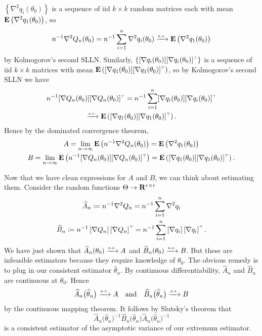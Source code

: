 \documentclass[11pt,letterpaper,reqno,oneside]{article}
\begin{document}
$\left\{ \nabla^2 q_i(\theta_0) \right\}$ is a sequence of iid $k \times k$ random matrices each with mean $\mathbf{E}\left( \nabla^2 q_1(\theta_0) \right)$, so
%
\begin{equation*}
	n^{-1} \nabla^2 Q_n(\theta_0)
	= n^{-1} \sum_{i=1}^n \nabla^2 q_i(\theta_0)
	\xrightarrow{{\scriptscriptstyle \mathrm{a.s.}}} \mathbf{E}\left( \nabla^2 q_1(\theta_0) \right)
\end{equation*}
%
by Kolmogorov's second SLLN. Similarly, $\left\{ [ \nabla q_i(\theta_0) ] [ \nabla q_i(\theta_0) ]^{\scriptscriptstyle \top} \right\}$ is a sequence of iid $k \times k$ matrices with mean $\mathbf{E}\left( [ \nabla q_1(\theta_0) ] [ \nabla q_1(\theta_0) ]^{\scriptscriptstyle \top} \right)$, so by Kolmogorov's second SLLN we have
%
\begin{multline*}
	n^{-1} [ \nabla Q_n(\theta_0) ] [ \nabla Q_n(\theta_0) ]^{\scriptscriptstyle \top}
	= n^{-1} \sum_{i=1}^n [ \nabla q_i(\theta_0) ] 
	[ \nabla q_i(\theta_0) ]^{\scriptscriptstyle \top}
	\\
	\xrightarrow{{\scriptscriptstyle \mathrm{a.s.}}} \mathbf{E}\left( [ \nabla q_1(\theta_0) ] 
	[ \nabla q_1(\theta_0) ]^{\scriptscriptstyle \top} \right) .
\end{multline*}
%
Hence by the dominated convergence theorem, 
%
\begin{gather*}
	A = \lim_{n\to\infty} 
	\mathbf{E}\left( n^{-1} \nabla^2 Q_n(\theta_0) \right)
	= \mathbf{E}\left( \nabla^2 q_1(\theta_0) \right)
	\\
	B = \lim_{n\to\infty} 
	\mathbf{E}\left( n^{-1} [ \nabla Q_n(\theta_0) ] 
	[ \nabla Q_n(\theta_0) ]^{\scriptscriptstyle \top} \right)
	= \mathbf{E}\left( [ \nabla q_1(\theta_0) ] 
	[ \nabla q_1(\theta_0) ]^{\scriptscriptstyle \top} \right) .
\end{gather*}


Now that we have clean expressions for $A$ and $B$, we can think about estimating them. Consider the random functions $\Theta \to \mathbf{R}^{r \times r}$
%
\begin{gather*}
	\widehat{A}_n
	\coloneqq n^{-1} \nabla^2 Q_n
	= n^{-1} \sum_{i=1}^n \nabla^2 q_i 
	\\
	\widehat{B}_n
	\coloneqq n^{-1} \left[ \nabla Q_n \right] 
	\left[ \nabla Q_n \right]^{\scriptscriptstyle \top}
	= n^{-1} \sum_{i=1}^n \left[ \nabla q_i \right] 
	\left[ \nabla q_i \right]^{\scriptscriptstyle \top} .
\end{gather*}
%
We have just shown that $\widehat{A}_n(\theta_0) \xrightarrow{{\scriptscriptstyle \mathrm{a.s.}}} A$ and $\widehat{B}_n(\theta_0) \xrightarrow{{\scriptscriptstyle \mathrm{a.s.}}} B$. But these are infeasible estimators because they require knowledge of $\theta_0$. The obvious remedy is to plug in our consistent estimator $\widehat{\theta}_n$. By continuous differentiability, $\widehat{A}_n$ and $\widehat{B}_n$ are continuous at $\theta_0$. Hence
%
\begin{equation*}
	\widehat{A}_n\bigl( \widehat{\theta}_n \bigr)
	\xrightarrow{{\scriptscriptstyle \mathrm{a.s.}}} A
	\quad\text{and}\quad
	\widehat{B}_n\bigl( \widehat{\theta}_n \bigr)
	\xrightarrow{{\scriptscriptstyle \mathrm{a.s.}}} B
\end{equation*}
%
by the continuous mapping theorem. It follows by Slutsky's theorem that
%
\begin{equation*}
	\widehat{A}_n\bigl( \widehat{\theta}_n \bigr)^{-1} 
	\widehat{B}_n\bigl( \widehat{\theta}_n \bigr) 
	\widehat{A}_n\bigl( \widehat{\theta}_n \bigr)^{-1} 
\end{equation*}
%
is a consistent estimator of the asymptotic variance of our extremum estimator.
\end{document}
